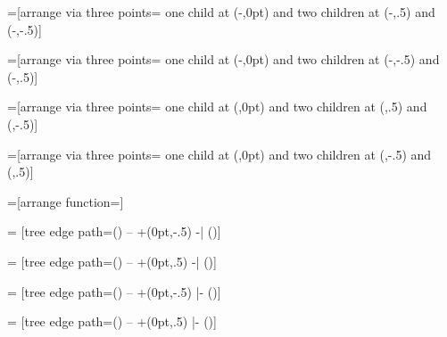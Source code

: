 =[arrange via three points=%
  {one child at (-\tikzleveldistance,0pt) and 
   two children at (-\tikzleveldistance,.5\tikzsiblingdistance) and (-\tikzleveldistance,-.5\tikzsiblingdistance)}]

=[arrange via three points=%
  {one child at (-\tikzleveldistance,0pt) and 
   two children at (-\tikzleveldistance,-.5\tikzsiblingdistance) and (-\tikzleveldistance,.5\tikzsiblingdistance)}]

=[arrange via three points=%
  {one child at (\tikzleveldistance,0pt) and 
   two children at (\tikzleveldistance,.5\tikzsiblingdistance) and (\tikzleveldistance,-.5\tikzsiblingdistance)}]

=[arrange via three points=%
  {one child at (\tikzleveldistance,0pt) and 
   two children at (\tikzleveldistance,-.5\tikzsiblingdistance) and (\tikzleveldistance,.5\tikzsiblingdistance)}]


%
%

=[arrange function=\tikz@arrange@circle]

\def\tikz@sibling@angle{20}

\def\tikz@arrange@circle{%
  \c@pgf@counta=\tikz@sibling@angle\relax%
  \c@pgf@countb=\tikz@sibling@angle\relax%
  \divide\c@pgf@counta by2\relax%
  \multiply\c@pgf@countb by\tikznumberofcurrentchild\relax%
  \c@pgf@countc=-\c@pgf@counta\relax
  \multiply\c@pgf@countc by\tikznumberofchildren\relax%
  \advance\c@pgf@countc by-\c@pgf@counta\relax
  \advance\c@pgf@countc by\c@pgf@countb\relax
  \pgftransformrotate{\the\c@pgf@countc}%
  \pgftransformxshift{\the\tikzleveldistance}%
}


%
%

=
  [tree edge path={(\tikzparentnode\tikzparentanchor) -- +(0pt,-.5\tikzleveldistance)  -| (\tikzchildnode\tikzchildanchor)}]

=
  [tree edge path={(\tikzparentnode\tikzparentanchor) -- +(0pt,.5\tikzleveldistance)  -| (\tikzchildnode\tikzchildanchor)}]

=
  [tree edge path={(\tikzparentnode\tikzparentanchor) -- +(0pt,-.5\tikzleveldistance) |- (\tikzchildnode\tikzchildanchor)}]

=
  [tree edge path={(\tikzparentnode\tikzparentanchor) -- +(0pt,.5\tikzleveldistance) |- (\tikzchildnode\tikzchildanchor)}]


                                    
\endinput

